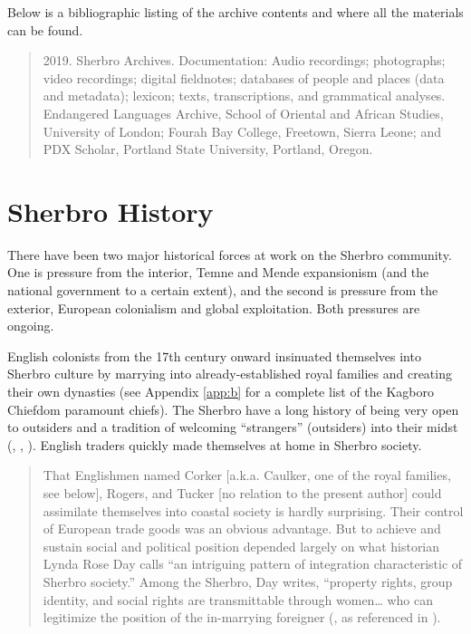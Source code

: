 Below is a bibliographic listing of the archive contents and where all the materials can be found.

\begin{quote}
    2019. Sherbro Archives. Documentation: Audio recordings; photographs; video recordings; digital fieldnotes; databases of people and places (data and metadata); lexicon; texts, transcriptions, and grammatical analyses. Endangered Languages Archive, School of Oriental and African Studies, University of London; Fourah Bay College, Freetown, Sierra Leone; and PDX Scholar, Portland State University, Portland, Oregon.
\end{quote}


\section{Sherbro History}
\label{sec:1.3}\hypertarget{Toc115517745}{}
There have been two major historical forces at work on the Sherbro community. One is pressure from the interior, Temne and Mende expansionism (and the national government to a certain extent), and the second is pressure from the exterior, European colonialism and global exploitation. Both pressures are ongoing.

English colonists from the 17th century onward insinuated themselves into Sherbro culture by marrying into already-established royal families and creating their own dynasties (see Appendix \ref{app:b} for a complete list of the Kagboro Chiefdom paramount chiefs). The Sherbro have a long history of being very open to outsiders and a tradition of welcoming “strangers” (outsiders) into their midst (\citealt{Brooks1993}, \citealt{Lowther2011},    \citealt{ShackSkinner1979}). English traders quickly made themselves at home in Sherbro society.

\begin{quote}
    That Englishmen named Corker [a.k.a. Caulker, one of the royal families, see below], Rogers, and Tucker [no relation to the present author] could assimilate themselves into coastal society is hardly surprising. Their control of European trade goods was an obvious advantage. But to achieve and sustain social and political position depended largely on what historian Lynda Rose Day calls “an intriguing pattern of integration characteristic of Sherbro society.” Among the Sherbro, Day writes, “property rights, group identity, and social rights are transmittable through women… who can legitimize the position of the in-marrying foreigner (\citealt[82--84]{Day1983}, as referenced in \citealt[29--30]{Lowther2011}).
\end{quote}

